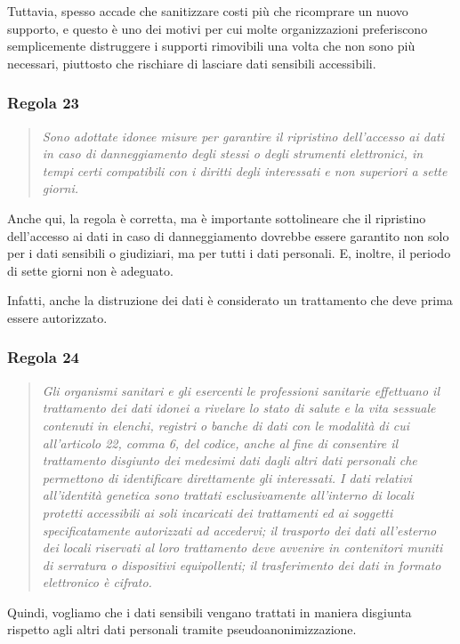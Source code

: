 Tuttavia, spesso accade che sanitizzare costi più che ricomprare un nuovo supporto, e questo è uno dei motivi per cui molte organizzazioni preferiscono semplicemente distruggere i supporti rimovibili una volta che non sono più necessari, piuttosto che rischiare di lasciare dati sensibili accessibili.

\subsubsection*{Regola 23}
\begin{quote}
    \textit{Sono adottate idonee misure per garantire il ripristino dell'accesso ai dati in caso di danneggiamento degli stessi o degli strumenti elettronici, in tempi certi compatibili con i diritti degli interessati e non superiori a sette giorni.}
\end{quote}
Anche qui, la regola è corretta, ma è importante sottolineare che il ripristino dell'accesso ai dati in caso di danneggiamento dovrebbe essere garantito non solo per i dati sensibili o giudiziari, ma per tutti i dati personali. E, inoltre, il periodo di sette giorni non è adeguato.

Infatti, anche la distruzione dei dati è considerato un trattamento che deve prima essere autorizzato.

\subsubsection*{Regola 24}
\begin{quote}
    \textit{Gli organismi sanitari e gli esercenti le professioni sanitarie effettuano il trattamento dei dati idonei a rivelare lo stato di salute e la vita sessuale contenuti in elenchi, registri o banche di dati con le modalità di cui all'articolo 22, comma 6, del codice, anche al fine di consentire il trattamento disgiunto dei medesimi dati dagli altri dati personali che permettono di identificare direttamente gli interessati. I dati relativi all'identità genetica sono trattati esclusivamente all'interno di locali protetti accessibili ai soli incaricati dei trattamenti ed ai soggetti specificatamente autorizzati ad accedervi; il trasporto dei dati all'esterno dei locali riservati al loro trattamento deve avvenire in contenitori muniti di serratura o dispositivi equipollenti; il trasferimento dei dati in formato elettronico è cifrato.}
\end{quote}

Quindi, vogliamo che i dati sensibili vengano trattati in maniera disgiunta rispetto agli altri dati personali tramite pseudoanonimizzazione.

